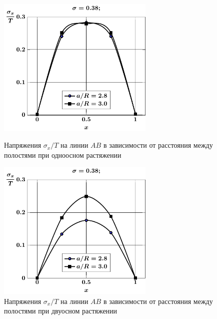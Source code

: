 \begin{figure}[h!]
\centering\footnotesize
\parbox[b]{7.5cm}{\centering\includegraphics[width=7.5cm]{periodic-spheres-cav27-a-t1-sig_x.pdf}
\caption{Напряжения $\sigma_x/T$ на линии $AB$ в зависимости от расстояния между полостями при одноосном растяжении
\label{f:11:4}}}\hfil\hfil
\parbox[b]{7.5cm}{\centering\includegraphics[width=7.5cm]{periodic-spheres-cav27-a-t2-sig_x.pdf}
\caption{Напряжения $\sigma_x/T$ на линии $AB$ в зависимости от расстояния между полостями при двуосном растяжении
\label{f:11:5}}}
\end{figure}

